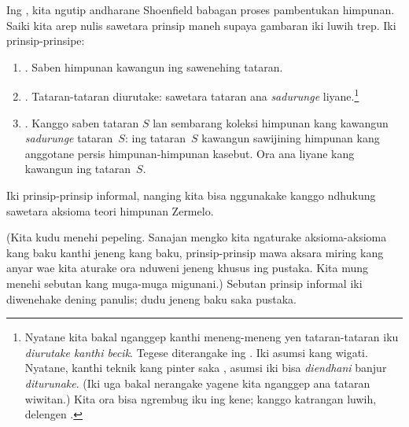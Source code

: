 \documentclass[../../../include/open-logic-section]{subfiles}
\begin{document}
	
Ing , kita ngutip andharane
Shoenfield babagan proses pambentukan himpunan. Saiki kita
arep nulis sawetara prinsip maneh supaya gambaran iki
luwih trep. Iki prinsip-prinsipe:
\begin{enumerate}
\item[] \stageshier. Saben himpunan kawangun ing sawenehing tataran.
\item[] \stagesord. Tataran-tataran diurutake: sawetara tataran
ana \emph{sadurunge} liyane.\footnote{Nyatane kita bakal nganggep
kanthi meneng-meneng yen tataran-tataran iku \emph{diurutake kanthi
becik}. Tegese diterangake ing .
Iki asumsi kang wigati. Nyatane, kanthi teknik kang pinter
saka \citet{Scott1974}, asumsi iki bisa \emph{diendhani}
banjur \emph{diturunake}. (Iki uga bakal nerangake yagene
kita nganggep ana tataran wiwitan.) Kita ora bisa ngrembug
iku ing kene; kanggo katrangan luwih, delengen
\citet{ButtonLT1}.}
\item[] \stagesacc. Kanggo saben tataran $S$ lan sembarang koleksi himpunan
kang kawangun \emph{sadurunge} tataran~$S$: ing tataran~$S$
kawangun sawijining himpunan kang anggotane persis
himpunan-himpunan kasebut. Ora ana liyane kang kawangun
ing tataran~$S$.
\end{enumerate}
Iki prinsip-prinsip informal, nanging kita bisa nggunakake
kanggo ndhukung sawetara aksioma teori himpunan Zermelo.

(Kita kudu menehi pepeling. Sanajan mengko kita ngaturake
aksioma-aksioma kang baku kanthi jeneng kang baku, prinsip-prinsip
mawa aksara miring kang anyar wae kita aturake ora nduweni
jeneng khusus ing pustaka. Kita mung menehi sebutan kang
muga-muga migunani.)
Sebutan prinsip informal iki diwenehake dening panulis; dudu jeneng baku saka pustaka.
\end{document}
